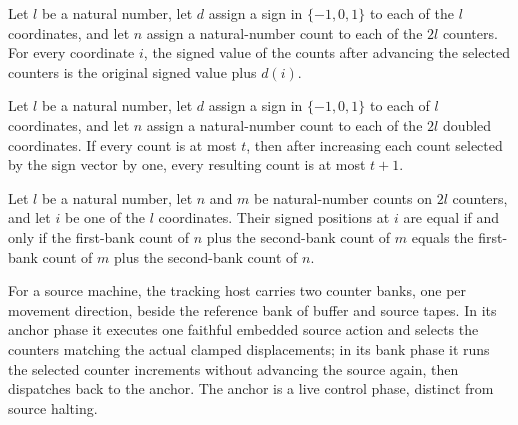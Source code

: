 \begin{lemma}
\label{Complexity.clSigned_advance}
\leanok
{}
Let $l$ be a natural number, let $d$ assign a sign in $\{-1,0,1\}$ to each of the $l$
coordinates, and let $n$ assign a natural-number count to each of the $2l$ counters. For
every coordinate $i$, the signed value of the counts after advancing the selected
counters is the original signed value plus $d(i)$.
\end{lemma}

\begin{lemma}
\label{Complexity.clAdvance_bound}
\leanok
{}
Let $l$ be a natural number, let $d$ assign a sign in $\{-1,0,1\}$ to each of $l$
coordinates, and let $n$ assign a natural-number count to each of the $2l$ doubled
coordinates. If every count is at most $t$, then after increasing each count selected by
the sign vector by one, every resulting count is at most $t+1$.
\end{lemma}

\begin{lemma}
\label{Complexity.clSigned_eq}
\leanok
{}
Let $l$ be a natural number, let $n$ and $m$ be natural-number counts on $2l$ counters,
and let $i$ be one of the $l$ coordinates. Their signed positions at $i$ are equal if
and only if the first-bank count of $n$ plus the second-bank count of $m$ equals the
first-bank count of $m$ plus the second-bank count of $n$.
\end{lemma}

\begin{definition}
\label{Complexity.clTrackTM}
\leanok
{}
For a source machine, the tracking host carries two counter banks, one per movement direction, beside the reference bank of buffer and source tapes. In its anchor phase it executes one faithful embedded source action and selects the counters matching the actual clamped displacements; in its bank phase it runs the selected counter increments without advancing the source again, then dispatches back to the anchor. The anchor is a live control phase, distinct from source halting.
\end{definition}

